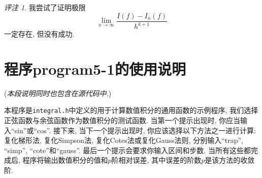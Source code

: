 \documentclass[a4paper]{ctexart}
\theoremstyle{plain}
\theoremstyle{remark}
\newtheorem{rem}[prop]{评注}
\numberwithin{equation}{section}
\begin{document}
\begin{rem}
    我尝试了证明极限
    \[\lim_{n\to\infty}\frac{I(f)-I_n(f)}{h^{k+1}}\]
    一定存在, 但没有成功.
\end{rem}

\section{程序program5-1的使用说明}
(\textit{本段说明同时也包含在源代码中.})

本程序是\verb|integral.h|中定义的用于计算数值积分的通用函数的示例程序, 我们选择正弦函数与余弦函数作为数值积分的测试函数.
当第一个提示出现时, 你应当输入``sin''或``cos''.
接下来, 当下一个提示出现时, 你应该选择以下方法之一进行计算: 复化梯形法, 复化Simpson法, 复化Cotes法或复化Gauss法则, 分别输入``trap'', ``simp'', ``cote''和``gauss''.
最后一个提示会要求你输入区间和步数.
当所有这些都完成后, 程序将输出数值积分的值和$p$阶相对误差, 其中误差的阶数$p$是该方法的收敛阶.
\end{document}
